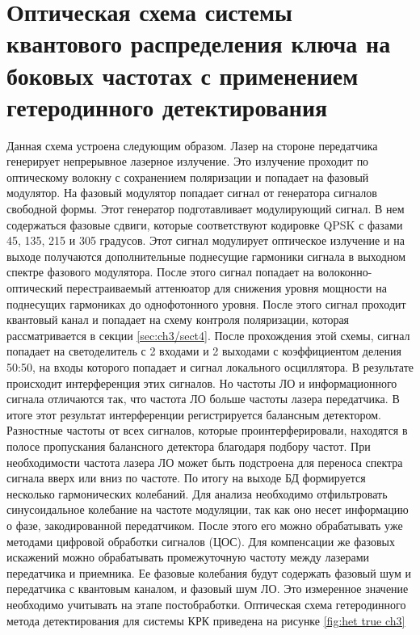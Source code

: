 \section{Оптическая схема системы квантового распределения ключа на боковых частотах с применением гетеродинного детектирования }\label{sec:ch3/sect5}
Данная схема устроена следующим образом. Лазер на стороне передатчика генерирует непрерывное лазерное излучение. Это излучение проходит по оптическому волокну с сохранением поляризации и попадает на фазовый модулятор. На фазовый модулятор попадает сигнал от генератора сигналов свободной формы. Этот генератор подготавливает модулирующий сигнал. В нем содержаться фазовые сдвиги, которые соответствуют кодировке QPSK с фазами 45, 135, 215 и 305 градусов. Этот сигнал модулирует оптическое излучение и на выходе получаются дополнительные поднесущие гармоники сигнала в выходном спектре фазового модулятора. После этого сигнал попадает на волоконно-оптический перестраиваемый аттенюатор для снижения уровня мощности на поднесущих гармониках до однофотонного уровня.
После этого сигнал проходит квантовый канал и попадает на схему контроля поляризации, которая рассматривается в секции \ref{sec:ch3/sect4}. После прохождения этой схемы, сигнал попадает на светоделитель с 2 входами и 2 выходами с коэффициентом деления 50:50, на входы которого попадает и сигнал локального осциллятора. В результате происходит интерференция этих сигналов. Но частоты ЛО и информационного сигнала отличаются так, что частота ЛО больше частоты лазера передатчика. В итоге этот результат интерференции регистрируется балансным детектором. Разностные частоты от всех сигналов, которые проинтерферировали, находятся в полосе пропускания балансного детектора благодаря подбору частот. При необходимости частота лазера ЛО может быть подстроена для переноса спектра сигнала вверх или вниз по частоте. По итогу на выходе БД формируется несколько гармонических колебаний. Для анализа необходимо отфильтровать синусоидальное колебание на частоте модуляции, так как оно несет информацию о фазе, закодированной передатчиком. После этого его можно обрабатывать уже методами цифровой обработки сигналов (ЦОС). Для компенсации же фазовых искажений можно обрабатывать промежуточную частоту между лазерами передатчика и приемника. Ее фазовые колебания будут содержать фазовый шум и передатчика с квантовым каналом, и фазовый шум ЛО. Это измеренное значение необходимо учитывать на этапе постобработки. 
Оптическая схема гетеродинного метода детектирования для системы КРК приведена на рисунке \ref*{fig:het true ch3} 
